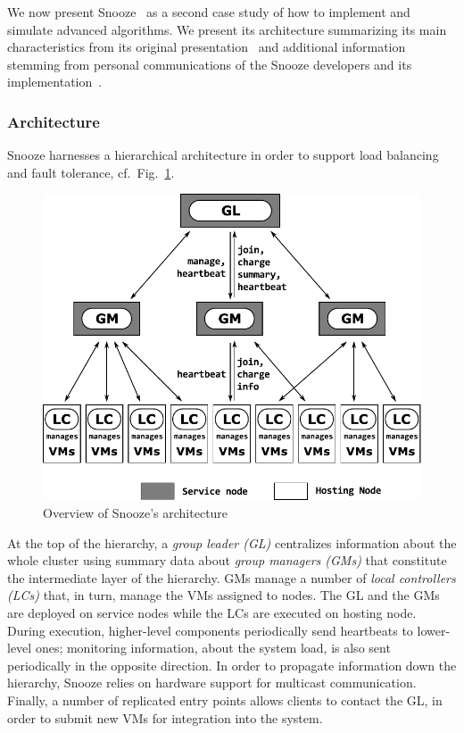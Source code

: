 We now present Snooze~\cite{feller:ccgrid12} as a second case study of how
to implement and simulate advanced algorithms.
We present its architecture summarizing its main
characteristics from its original presentation~\cite{feller:ccgrid12} and
additional information  stemming from personal communications of the Snooze
developers and its implementation~\cite{snoozeweb,snoozedev14}.

\subsubsection{Architecture}
\label{sec:snoozeArchi}

Snooze harnesses a hierarchical architecture in order to support load
balancing and fault tolerance, cf.\ Fig.~\ref{fig:snoozearch}.

\begin{figure}[hbp]
  \begin{center}
  \includegraphics[width=.85\linewidth]{figures/snoozearch.pdf}
  \caption{Overview of Snooze's architecture}
  \label{fig:snoozearch}
\end{center}
\vspace*{-.3cm}
\end{figure}

At the
top of the hierarchy, a \emph{group leader (GL)} centralizes
information about the whole cluster using summary data about
\emph{group managers (GMs)} that constitute the intermediate layer of
the hierarchy. GMs manage a number of \emph{local controllers (LCs)}
that, in turn, manage the VMs assigned to nodes. The GL and the GMs
are deployed on service nodes while the LCs are executed on hosting
node.  During execution, higher-level components periodically send
heartbeats to lower-level ones; monitoring information, \eg about the
system load, is also sent periodically in the opposite direction. In
order to propagate information down the hierarchy, Snooze relies on
hardware support for multicast communication. Finally, a number of
replicated entry points allows clients to contact the GL, \eg in order
to submit new VMs for integration into the system.

